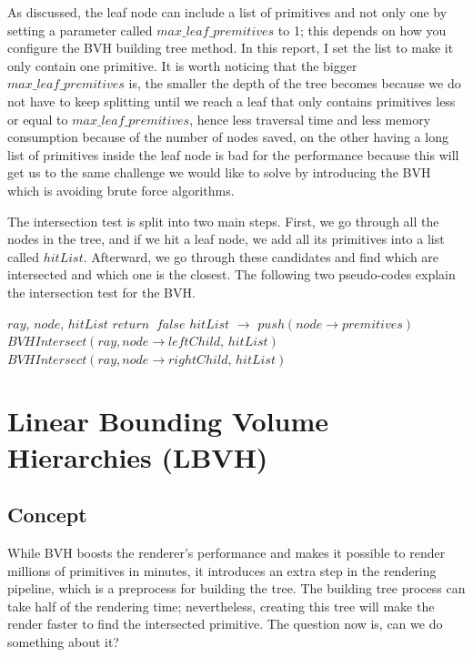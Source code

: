 \documentclass[11pt,a4paper]{article}
\begin{document}
As discussed, the leaf node can include a list of primitives and not only one by setting a parameter called $max\_leaf\_premitives$ to 1; this depends on how you configure the BVH building tree method. In this report, I set the list to make it only contain one primitive. It is worth noticing that the bigger $max\_leaf\_premitives$ is, the smaller the depth of the tree becomes because we do not have to keep splitting until we reach a leaf that only contains primitives less or equal to $max\_leaf\_premitives$, hence less traversal time and less memory consumption because of the number of nodes saved, on the other having a long list of primitives inside the leaf node is bad for the performance because this will get us to the same challenge we would like to solve by introducing the BVH which is avoiding brute force algorithms.
\\
\noindent

The intersection test is split into two main steps. First, we go through all the nodes in the tree, and if we hit a leaf node, we add all its primitives into a list called $hitList$. Afterward, we go through these candidates and find which are intersected and which one is the closest. The following two pseudo-codes explain the intersection test for the BVH. 


\begin{algorithm}[H]
	\caption{$BVHIntersect$}\label{alg:alg1}
	\begin{algorithmic}
		\Require $ray$, $node$, $hitList$
			\State $return\;\;false$
		\EndIf
		    \State $hitList$ $\rightarrow$ $push(node \rightarrow premitives)$
		\Else
			\State $BVHIntersect(ray, node \rightarrow leftChild,\, hitList)$
			\State $BVHIntersect(ray, node \rightarrow rightChild,\, hitList)$
		\EndIf
	\end{algorithmic}
\end{algorithm}

\clearpage

\section{Linear Bounding Volume Hierarchies (LBVH)}
\subsection{Concept}
While BVH boosts the renderer's performance and makes it possible to render millions of primitives in minutes, it introduces an extra step in the rendering pipeline, which is a preprocess for building the tree. The building tree process can take half of the rendering time; nevertheless, creating this tree will make the render faster to find the intersected primitive. The question now is, can we do something about it? 
\\
\noindent
\end{document}
